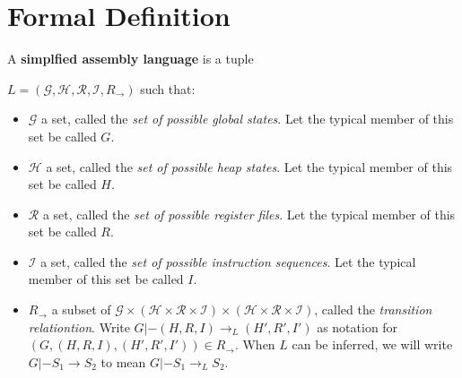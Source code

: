 \section{Formal Definition}

\begin{definition}
  A \textbf{simplfied assembly language} is a tuple

  $L = (\mathcal{G}, \mathcal{H}, \mathcal{R}, \mathcal{I}, R_\to)$ such that:

  \begin{itemize}
  \item $\mathcal{G}$ a set, called the \emph{set of possible global
      states}. Let the typical member of this set be called $G$.
  \item $\mathcal{H}$ a set, called the \emph{set of possible heap states}. Let
    the typical member of this set be called $H$.
  \item $\mathcal{R}$ a set, called the \emph{set of possible register files}.
    Let the typical member of this set be called $R$.
  \item $\mathcal{I}$ a set, called the \emph{set of possible instruction
      sequences}. Let the typical member of this set be called $I$.
  \item $R_\to$ a subset of
    $\mathcal{G} \times (\mathcal{H} \times \mathcal{R} \times \mathcal{I})
    \times (\mathcal{H} \times \mathcal{R} \times \mathcal{I})$,
    called the \emph{transition relationtion}.  Write
    $G |- (H, R, I) \to_L (H', R', I')$ as notation for
    $(G, (H, R, I), (H', R', I')) \in R_\to$.  When $L$ can be inferred, we will
    write $G |- S_1 \to S_2$ to mean $G |- S_1 \to_L S_2$.
  \end{itemize}
\end{definition}

